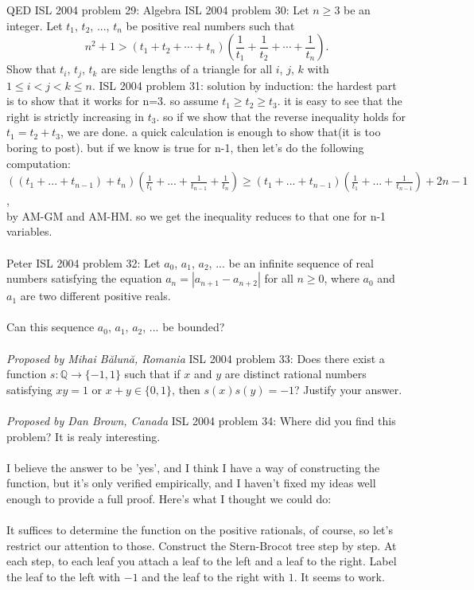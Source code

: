 QED 
ISL 2004 problem 29:  Algebra 
ISL 2004 problem 30:  Let $n \geq 3$ be an integer. Let $t_1$, $t_2$, ..., $t_n$ be positive real numbers such that
\[
n^2 + 1 > \left( t_1 + t_2 + \cdots + t_n \right) \left( \frac{1}{t_1} + \frac{1}{t_2} + \cdots + \frac{1}{t_n} \right).
\]
Show that $t_i$, $t_j$, $t_k$ are side lengths of a triangle for all $i$, $j$, $k$ with $1 \leq i < j < k \leq n$. 
ISL 2004 problem 31:  solution by induction: the hardest part is to show that it works for n=3. so assume $t_1\geq t_2\geq t_3$. it is easy to see that the right is strictly increasing in $t_3$. so if we show that the reverse inequality holds for $t_1=t_2+t_3$, we are done. a quick calculation is enough to show that(it is too boring to post). but if we know is true for n-1, then let's do the following computation: \\
$((t_1+...+t_{n-1})+t_n)(\frac{1}{t_1}+...+\frac{1}{t_{n-1}}+\frac{1}{t_n})\geq (t_1+...+t_{n-1})(\frac{1}{t_1}+...+\frac{1}{t_{n-1}})+2n-1$, \\
by AM-GM and AM-HM. so we get the inequality reduces to that one for n-1 variables. \\\\
Peter 
ISL 2004 problem 32:  Let $a_0$, $a_1$, $a_2$, ... be an infinite sequence of real numbers satisfying the equation $a_n=\left|a_{n+1}-a_{n+2}\right|$ for all $n\geq 0$, where $a_0$ and $a_1$ are two different positive reals. \\\\
Can this sequence $a_0$, $a_1$, $a_2$, ... be bounded? \\\\
\textit{Proposed by Mihai Bălună, Romania} 
ISL 2004 problem 33:  Does there exist a function $s\colon \mathbb{Q} \rightarrow \{-1,1\}$ such that if $x$ and $y$ are distinct rational numbers satisfying ${xy=1}$ or ${x+y\in \{0,1\}}$, then ${s(x)s(y)=-1}$? Justify your answer. \\\\
\textit{Proposed by Dan Brown, Canada} 
ISL 2004 problem 34:  Where did you find this problem? It is realy interesting. \\\\
I believe the answer to be 'yes', and I think I have a way of constructing the function, but it's only verified empirically, and I haven't fixed my ideas well enough to provide a full proof. Here's what I thought we could do: \\\\
It suffices to determine the function on the positive rationals, of course, so let's restrict our attention to those. Construct the Stern-Brocot tree step by step. At each step, to each leaf you attach a leaf to the left and a leaf to the right. Label the leaf to the left with $-1$ and the leaf to the right with $1$. It seems to work. 
